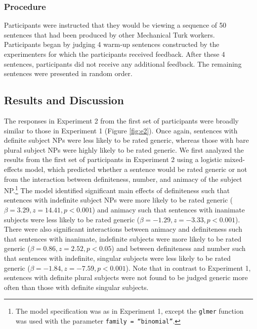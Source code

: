 \documentclass[10pt,letterpaper]{article}
\begin{document}
\subsubsection{Procedure} 

Participants were instructed that they would be viewing a sequence of 50 sentences that had been produced by other Mechanical Turk workers. Participants began by judging 4 warm-up sentences constructed by the experimenters for which the participants received feedback. After these 4 sentences, participants did not receive any additional feedback. The remaining sentences were presented in random order. 

\subsection{Results and Discussion}

The responses in Experiment 2 from the first set of participants were broadly similar to those in Experiment 1 (Figure \ref{fig:e2}). Once again, sentences with definite subject NPs were less likely to be rated generic, whereas those with bare plural subject NPs were highly likely to be rated generic. We first analyzed the results from the first set of participants in Experiment 2 using a logistic mixed-effects model, which predicted whether a sentence would be rated generic or not from the interaction between definiteness, number, and animacy of the subject NP.\footnote{The model specification was as in Experiment 1, except the \texttt{glmer} function was used with the parameter \texttt{family = ``binomial''}.} The model identified significant main effects of definiteness such that sentences with indefinite subject NPs were more likely to be rated generic (\(\beta = 3.29, z = 14.41, p < 0.001\)) and animacy such that sentences with inanimate subjects were less likely to be rated generic (\(\beta = -1.29, z = -3.33, p < 0.001\)). There were also significant interactions between animacy and definiteness such that sentences with inanimate, indefinite subjects were more likely to be rated generic (\(\beta = 0.86, z = 2.52, p < 0.05\)) and between definiteness and number such that sentences with indefinite, singular subjects were less likely to be rated generic (\(\beta = -1.84, z = -7.59, p < 0.001\)). Note that in contrast to Experiment 1, sentences with definite plural subjects were not found to be judged generic more often than those with definite singular subjects.
\end{document}
